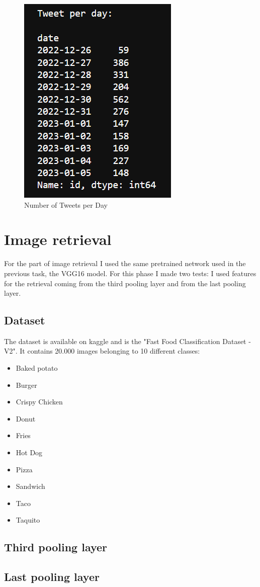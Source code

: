 \documentclass[12pt,journal,compsoc]{IEEEtran}
\begin{document}
\begin{figure}[H]
  \begin{center}
  \includegraphics[scale=1]{./images/tweetxday.png}
  \end{center}
  \caption{Number of Tweets per Day}
\end{figure}

\section{Image retrieval}
For the part of image retrieval I used the same pretrained network used in the previous task, the VGG16 model. For this phase I made two tests: I used features for the retrieval coming from the third pooling layer and from the last pooling layer.
\subsection{Dataset}
The dataset is available on kaggle and is the "Fast Food Classification Dataset - V2". It contains 20.000 images belonging to 10 different classes:
\begin{itemize}
	\item Baked potato
	\item Burger
	\item Crispy Chicken
	\item Donut 
	\item Fries 
	\item Hot Dog 
	\item Pizza 
	\item Sandwich
	\item Taco 
	\item Taquito
\end{itemize}
\subsection{Third pooling layer}

\subsection{Last pooling layer}

\nocite{*}
\printbibliography
\end{document}
